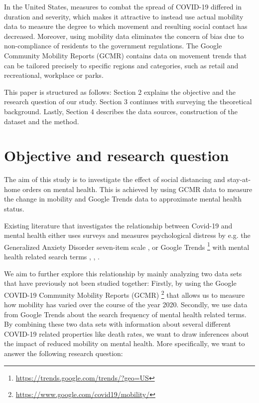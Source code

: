 In the United States, measures to combat the spread of COVID-19 differed in duration and severity, which makes it attractive to instead use actual mobility data to measure the degree to which movement and resulting social contact has decreased. Moreover, using mobility data eliminates the concern of bias due to non-compliance of residents to the government regulations. The Google Community Mobility Reports (GCMR) contains data on movement trends that can be tailored precisely to specific regions and categories, such as retail and recreational, workplace or parks.

This paper is structured as follows: Section 2 explains the objective and the research question of our study. Section 3 continues with surveying the theoretical background.  Lastly, Section 4 describes the data sources, construction of the dataset and the method.




\section{Objective and research question}
\label{S:2}
The aim of this study is to investigate the effect of social distancing and stay-at-home orders on mental health. This is achieved by using GCMR data to measure the change in mobility and Google Trends data to approximate mental health status.

Existing literature that investigates the relationship between Covid-19 and mental health either uses surveys and measures psychological distress by e.g. the Generalized Anxiety Disorder seven-item scale \citep{Spitzer2006} \citep{Zhang2020}, \citep{Devaraj2021} or Google Trends \footnote{\url{https://trends.google.com/trends/?geo=US}} with mental health related search terms \citep{Berger2021}, \citep{Hoerger2020}, \citep{Halford2020}.

We aim to further explore this relationship by mainly analyzing two data sets that have previously not been studied together:
Firstly, by using %
the Google COVID-19 Community Mobility Reports (GCMR) \footnote{\url{https://www.google.com/covid19/mobility/}} that allows us to measure how mobility has varied over the course of the year 2020. Secondly, we use data from Google Trends about the search frequency of mental health related terms. 
By combining these two data sets with information about several different COVID-19 related properties like death rates, we want to draw inferences about the impact of reduced mobility on mental health. More specifically, we want to answer the following research question:
\\

